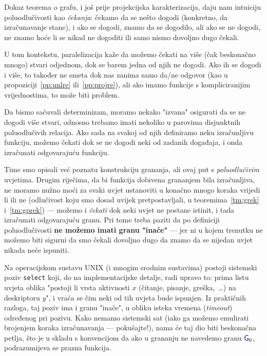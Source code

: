 
Dokaz teorema o grafu, i još prije projekcijska karakterizacija, daju nam intuiciju poluodlučivosti kao \emph{čekanja}: čekamo da se nešto dogodi (konkretno, da izračunavanje stane), i ako se dogodi, znamo da se dogodilo, ali ako se ne dogodi, ne znamo hoće li se nikad ne dogoditi ili samo nismo dovoljno dugo čekali.

U tom kontekstu, paralelizacija kaže da možemo čekati na više (čak beskonačno mnogo) stvari odjednom, dok se barem jedna od njih ne dogodi. Ako ih se dogodi i više, to također ne smeta dok nas zanima samo da\slash ne odgovor (kao u propoziciji~\ref{pp:unlre} ili~\ref{pp:projre}), ali ako imamo funkcije s kompliciranijim vrijednostima, to može biti problem.%

Da bismo sačuvali determinizam, moramo nekako "izvana" osigurati da se ne dogodi više stvari, odnosno trebamo imati nekoliko u parovima disjunktnih poluodlučivih relacija. Ako sada na svakoj od njih definiramo neku izračunljivu funkciju, možemo čekati dok se ne dogodi neki od zadanih događaja, i onda izračunati odgovarajuću funkciju.

Time smo opisali već poznatu konstrukciju grananja, ali ovaj put s \emph{poluodlučivim} uvjetima. Drugim riječima, da bi funkcija dobivena grananjem bila izračunljiva, ne moramo nužno moći za svaki uvjet ustanoviti u konačno mnogo koraka vrijedi li ili ne (odlučivost koju smo dosad uvijek pretpostavljali, u teoremima~\ref{tm:grek} i~\ref{tm:gprek}) --- možemo i \emph{čekati} dok neki uvjet ne postane istinit, i tada izračunati odgovarajuću granu. Pri tome treba paziti da po definiciji poluodlučivosti \textbf{ne možemo imati granu "inače"} --- jer ni u kojem trenutku ne možemo biti sigurni da smo čekali dovoljno dugo da znamo da se nijedan uvjet nikada neće ispuniti.

Na operacijskom sustavu UNIX (i mnogim srodnim sustavima) postoji sistemski poziv \texttt{select} koji, do na implementacijske detalje, radi upravo to: prima listu uvjeta oblika "postoji li vrsta aktivnosti $x$ (čitanje, pisanje, greška,~\ldots) na deskriptoru $y$", i vraća se čim neki od tih uvjeta bude ispunjen. Iz praktičnih razloga, taj poziv ima i granu "inače", u obliku isteka vremena (\emph{timeout}) određenog pri pozivu. Kako nemamo sistemski sat (iako ga možemo emulirati brojenjem koraka izračunavanja --- pokušajte!), nama će taj dio biti beskonačna petlja, što je u skladu s konvencijom da ako u grananju ne navedemo granu $\f G_0$, podrazumijeva se prazna funkcija.

